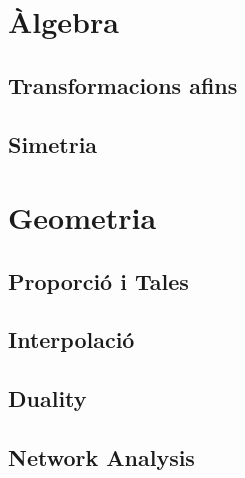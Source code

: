 \section{Àlgebra}
































\subsection{Transformacions afins}








\subsection{Simetria}


\section{Geometria}

\subsection{Proporció i Tales}


\subsection{Interpolació}



\subsection{Duality}


\subsection{Network Analysis}
